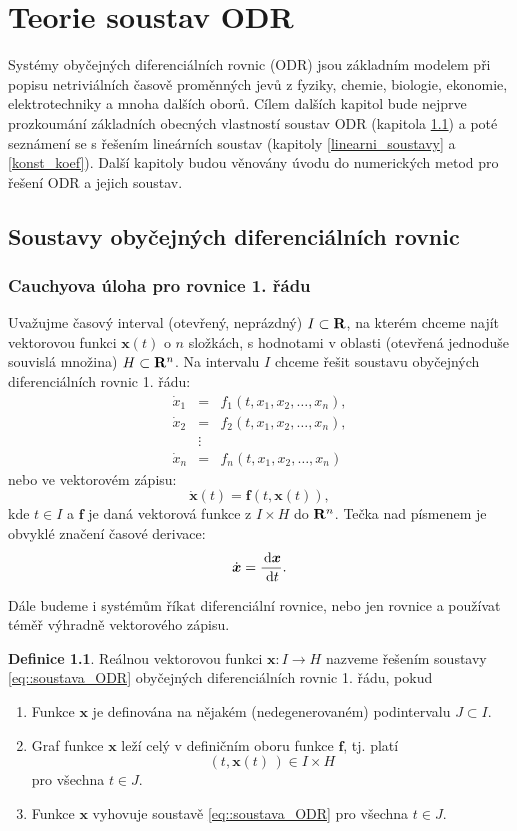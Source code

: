 \documentclass[a4paper, 12pt]{book}
\theoremstyle{definition}
\newtheorem{definition}[theorem]{Definice}
\def\to{\rightarrow}
\def\Real{{\rm\bf R}}
\def\d{\,{\rm d}}               %
\def\vc#1{\mathbf{\boldsymbol{#1}}}     %
\begin{document}
\chapter{Teorie soustav ODR}
Systémy obyčejných diferenciálních rovnic (ODR) jsou základním modelem při popisu netriviálních 
časově proměnných jevů z fyziky, chemie, biologie, ekonomie, elektrotechniky a mnoha dalších oborů. 
Cílem dalších kapitol bude nejprve prozkoumání základních obecných vlastností soustav ODR (kapitola \ref{soustavy})
a poté seznámení se s řešením lineárních soustav (kapitoly \ref{linearni_soustavy} a \ref{konst_koef}). Další kapitoly budou věnovány 
úvodu do numerických metod pro řešení ODR a jejich soustav.

\section{Soustavy obyčejných diferenciálních rovnic}
\label{soustavy}

\subsection{Cauchyova úloha pro rovnice 1. řádu}
Uvažujme časový interval (otevřený, neprázdný) $I \subset \Real$, na kterém chceme najít vektorovou funkci $\vc x(t)$ o $n$ složkách, s hodnotami 
v oblasti (otevřená jednoduše souvislá množina) $H \subset \Real^n$. Na intervalu $I$ chceme řešit 
soustavu obyčejných diferenciálních rovnic 1. řádu:
\begin{eqnarray*}
\dot x_1 &=& f_1(t, x_1, x_2, \dots, x_n),\\
\dot x_2 &=& f_2(t, x_1, x_2, \dots, x_n),\\
&\vdots& \\
\dot x_n &=& f_n(t, x_1, x_2, \dots, x_n)
\end{eqnarray*}
nebo ve vektorovém zápisu:
\begin{equation}
    \label{eq::soustava_ODR}
    \dot{\vc x}(t) = \vc f(t, \vc x(t) ),
\end{equation}
kde $t\in I$ a $\vc f$ je daná vektorová funkce z $I\times H$ do $\Real^n$. Tečka nad písmenem je obvyklé značení časové derivace:
\[
    \dot{\vc x}= \frac{\d \vc x}{\d t}.
\]

Dále budeme i systémům říkat diferenciální rovnice, nebo jen rovnice a používat téměř výhradně vektorového zápisu.


\begin{definition}
Reálnou vektorovou funkci $\vc x: I \to H$ nazveme řešením soustavy \eqref{eq::soustava_ODR} 
obyčejných diferenciálních rovnic 1. řádu, pokud
\begin{enumerate}
\item Funkce $\vc x$ je definována na nějakém (nedegenerovaném) podintervalu $J\subset I$. 
\item Graf funkce $\vc x$ leží celý v definičním oboru funkce $\vc f$, tj. 
platí 
\[
    (t, \vc x (t)\,)  \in I \times H 
\]
 pro všechna $t\in J$.
\item Funkce $\vc x$ vyhovuje soustavě \eqref{eq::soustava_ODR} pro všechna $t\in J$. 
\end{enumerate}
\end{definition}
\end{document}

